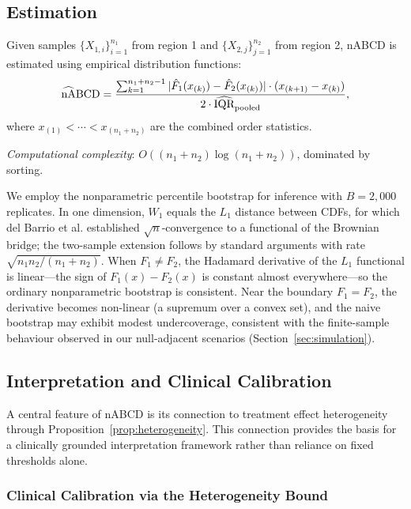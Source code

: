 \documentclass[AMA,Times1COL]{WileyNJDv5}
\newcommand{\hnABCD}{\mathrlap{\widehat{\phantom{\text{nA}}}}\text{nABCD}}
\begin{document}
\subsection{Estimation}\label{sec:estimation}

Given samples $\{X_{1,i}\}_{i=1}^{n_1}$ from region 1 and $\{X_{2,j}\}_{j=1}^{n_2}$ from region 2, nABCD is estimated using empirical distribution functions:
\begin{equation}
\hnABCD = \frac{\sum_{k=1}^{n_1+n_2-1} |\hat{F}_1(x_{(k)}) - \hat{F}_2(x_{(k)})| \cdot (x_{(k+1)} - x_{(k)})}{2 \cdot \widehat{\text{IQR}}_{\text{pooled}}},
\label{eq:estimator}
\end{equation}
where $x_{(1)} < \cdots < x_{(n_1+n_2)}$ are the combined order statistics.

\emph{Computational complexity}: $O((n_1 + n_2) \log(n_1 + n_2))$, dominated by sorting.

We employ the nonparametric percentile bootstrap for inference\cite{delbarrio1999,sommerfeld2018} with $B = 2{,}000$ replicates.
In one dimension, $W_1$ equals the $L_1$ distance between CDFs, for which del Barrio et al.\cite{delbarrio1999} established $\sqrt{n}$-convergence to a functional of the Brownian bridge; the two-sample extension follows by standard arguments with rate $\sqrt{n_1 n_2/(n_1+n_2)}$.
When $F_1 \neq F_2$, the Hadamard derivative of the $L_1$ functional is linear---the sign of $F_1(x)-F_2(x)$ is constant almost everywhere---so the ordinary nonparametric bootstrap is consistent.\cite{sommerfeld2018}
Near the boundary $F_1 = F_2$, the derivative becomes non-linear (a supremum over a convex set), and the naive bootstrap may exhibit modest undercoverage, consistent with the finite-sample behaviour observed in our null-adjacent scenarios (Section~\ref{sec:simulation}).

\subsection{Interpretation and Clinical Calibration}\label{sec:inference}

A central feature of nABCD is its connection to treatment effect heterogeneity through Proposition~\ref{prop:heterogeneity}. This connection provides the basis for a clinically grounded interpretation framework rather than reliance on fixed thresholds alone.

\subsubsection{Clinical Calibration via the Heterogeneity Bound}
\end{document}
